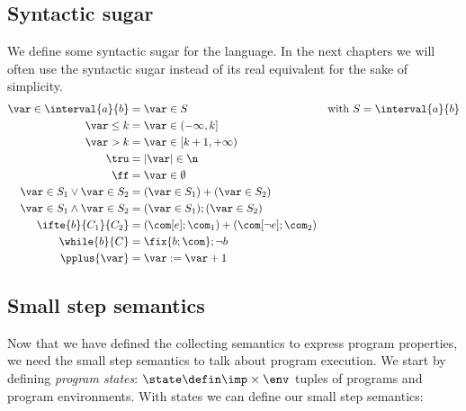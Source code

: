 \subsection{Syntactic sugar}\label{sub:sugar}
We define some syntactic sugar for the language. In the next chapters
we will often use the syntactic sugar instead of its real equivalent
for the sake of simplicity.
\begin{align*}
  \var \in \interval{a}{b} & = \var \in S & \text{with } S = \interval{a}{b}\\
  \var \leq k & = \var \in (-\infty, k]\\
  \var > k & = \var \in [k+1, + \infty) \\
  \tru & = |\var| \in \n \\
  \ff & = \var \in \emptyset \\
  \var \in S_1 \vee \var \in S_2 & = (\var \in S_1) + (\var \in S_2) \\ 
  \var \in S_1 \wedge \var \in S_2 & = (\var \in S_1);(\var \in S_2) \\
  \ifte{b}{C_1}{C_2} & = (\com[e];\com_1) + (\com[\neg e];\com_2) \\
  \while{b}{C} & = \fix{b;\com};\neg b \\
  \pplus{\var} & = \var := \var + 1
\end{align*}

\subsection{Small step semantics}\label{sub:sos}

Now that we have defined the collecting semantics to express program
properties, we need the small step semantics to talk about program
execution. We start by defining \emph{program states}:
\(\state \defin \imp \times \env\) tuples of programs and program
environments.  With states we can define our small step semantics:

